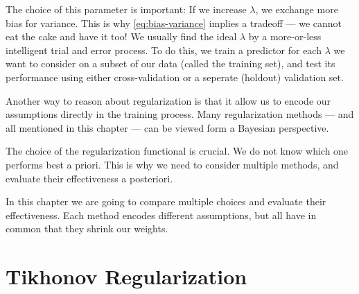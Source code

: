The choice of this parameter is important:
If we increase \(\lambda\), we exchange more bias for variance.
This is why \cref{eq:bias-variance} implies a tradeoff --- we cannot eat the cake and have it too!
We usually find the ideal \(\lambda\) by a more-or-less intelligent trial and error process.
To do this, we train a predictor for each \(\lambda\) we want to consider on a subset of our data (called the training set), and test its performance using either cross-validation or a seperate (holdout) validation set. 

Another way to reason about regularization is that it allow us to encode our
assumptions directly in the training process.
Many regularization methods --- and all mentioned in this chapter --- can be
viewed form a Bayesian perspective.

The choice of the regularization functional is crucial.
We do not know which one performs best a priori.
This is why we need to consider multiple methods, and evaluate their
effectiveness a posteriori.

In this chapter we are going to compare multiple choices and evaluate their effectiveness.
Each method encodes different assumptions, but all have in common that they
shrink our weights.

\section{Tikhonov Regularization}
